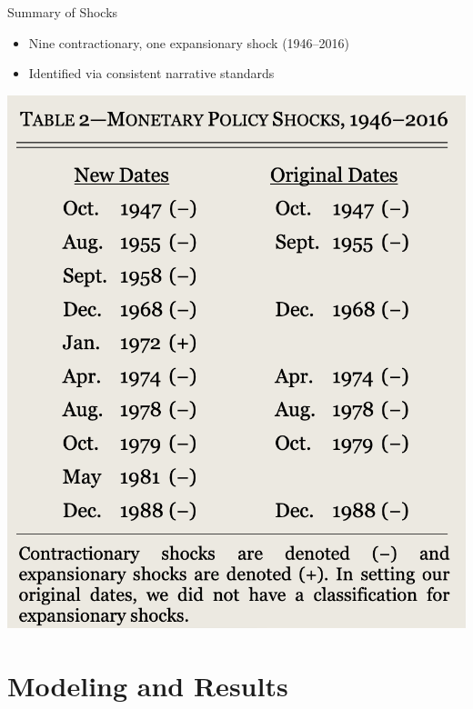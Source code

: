 \documentclass{beamer}
\begin{document}
\begin{frame}{Summary of Shocks}
  \begin{itemize}
    \item Nine contractionary, one expansionary shock (1946–2016)
    \item Identified via consistent narrative standards
  \end{itemize}
  \centering
  \includegraphics[height=0.6\textheight]{Graphs/Summary of Identified Shocks.png}
\end{frame}

\section{Modeling and Results}
\end{document}
